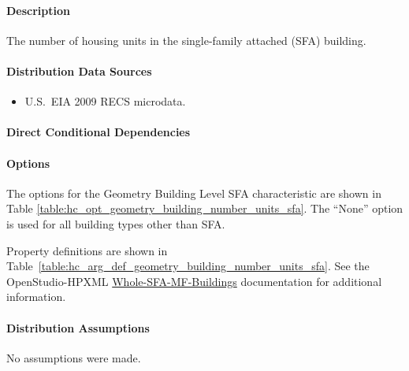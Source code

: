 \paragraph{Description}
% 
The number of housing units in the single-family attached (SFA) building.

\paragraph{Distribution Data Sources}
% 
\begin{itemize}
    \item U.S.~EIA 2009 RECS microdata.
\end{itemize}

\paragraph{Direct Conditional Dependencies}


\paragraph{Options}
The options for the Geometry Building Level SFA characteristic are shown in Table \ref{table:hc_opt_geometry_building_number_units_sfa}. The ``None'' option is used for all building types other than SFA.



Property definitions are shown in Table~\ref{table:hc_arg_def_geometry_building_number_units_sfa}. See the OpenStudio-HPXML \href{https://openstudio-hpxml.readthedocs.io/en/v1.10.0/workflow_inputs.html#whole-sfa-mf-buildings}{Whole-SFA-MF-Buildings} documentation for additional information.



\paragraph{Distribution Assumptions}
% 
No assumptions were made.

